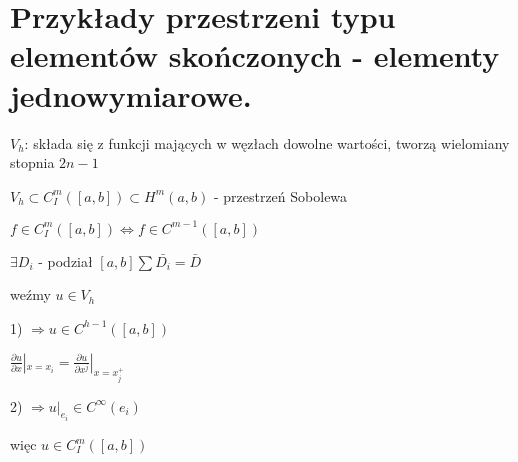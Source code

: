 \section{Przykłady przestrzeni typu elementów skończonych - elementy jednowymiarowe.}

$V_h$: składa się z funkcji mających w węzłach dowolne wartości, tworzą wielomiany stopnia $2n-1$ 

$V_h \subset C_I^m([a,b]) \subset H^m(a,b)$ - przestrzeń Sobolewa

$f \in C_I^m([a,b]) \Leftrightarrow f \in C^{m-1}([a,b])$

$\exists D_i$ - podział $[a,b] \sum \bar{D_i} = \bar{D}$

weźmy $u \in V_h$

1) $\Rightarrow u \in C^{h-1}([a,b])$

$\frac{\partial u}{\partial x} |_{x=x_i} = \frac{\partial u}{\partial x^j} |_{x=x^+_j}$

2) $\Rightarrow u|_{e_i} \in C^\infty (e_i)$

więc $u \in C_I^m([a,b])$